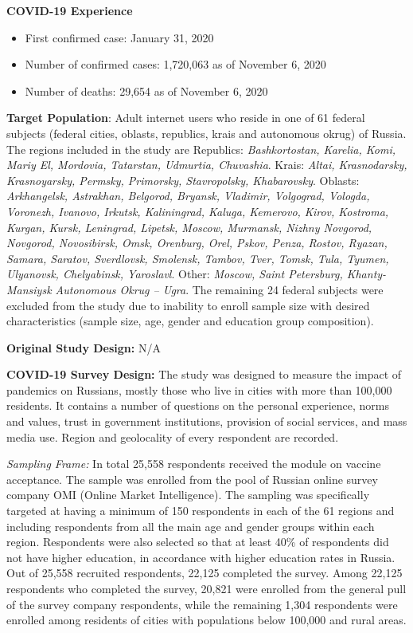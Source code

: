 \documentclass[
  12pt,
]{article}
\begin{document}
\textbf{COVID-19 Experience}

\begin{itemize}
\item First confirmed case: January 31, 2020
\item Number of confirmed cases: 1,720,063 as of November 6, 2020 
\item Number of deaths:  29,654 as of November 6, 2020 
\end{itemize}

\textbf{Target Population}: Adult internet users who reside in one of 61 federal subjects (federal cities, oblasts, republics, krais and autonomous okrug) of Russia. The regions included in the study are Republics: \emph{Bashkortostan, Karelia, Komi, Mariy El, Mordovia, Tatarstan, Udmurtia, Chuvashia}. Krais: \emph{Altai, Krasnodarsky, Krasnoyarsky, Permsky, Primorsky, Stavropolsky, Khabarovsky}. Oblasts: \emph{Arkhangelsk, Astrakhan, Belgorod, Bryansk, Vladimir, Volgograd, Vologda, Voronezh, Ivanovo, Irkutsk, Kaliningrad, Kaluga, Kemerovo, Kirov, Kostroma, Kurgan, Kursk, Leningrad, Lipetsk, Moscow, Murmansk, Nizhny Novgorod, Novgorod, Novosibirsk, Omsk, Orenburg, Orel, Pskov, Penza, Rostov, Ryazan, Samara, Saratov, Sverdlovsk, Smolensk, Tambov, Tver, Tomsk, Tula, Tyumen, Ulyanovsk, Chelyabinsk, Yaroslavl}. Other: \emph{Moscow, Saint Petersburg, Khanty-Mansiysk Autonomous Okrug -- Ugra}. The remaining 24 federal subjects were excluded from the study due to inability to enroll sample size with desired characteristics (sample size, age, gender and education group composition).

\textbf{Original Study Design:} N/A

\textbf{COVID-19 Survey Design:} The study was designed to measure the impact of pandemics on Russians, mostly those who live in cities with more than 100,000 residents. It contains a number of questions on the personal experience, norms and values, trust in government institutions, provision of social services, and mass media use. Region and geolocality of every respondent are recorded.

\emph{Sampling Frame:} In total 25,558 respondents received the module on vaccine acceptance. The sample was enrolled from the pool of Russian online survey company OMI (Online Market Intelligence). The sampling was specifically targeted at having a minimum of 150 respondents in each of the 61 regions and including respondents from all the main age and gender groups within each region. Respondents were also selected so that at least 40\% of respondents did not have higher education, in accordance with higher education rates in Russia. Out of 25,558 recruited respondents, 22,125 completed the survey. Among 22,125 respondents who completed the survey, 20,821 were enrolled from the general pull of the survey company respondents, while the remaining 1,304 respondents were enrolled among residents of cities with populations below 100,000 and rural areas.
\end{document}
